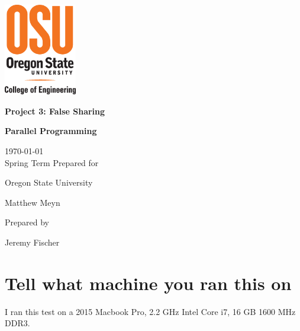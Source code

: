 \documentclass[onecolumn,draftclsnofoot, 10pt, compsoc]{IEEEtran}
\def \GroupNumber{		17}
\def \Jeremy{			Jeremy Fischer}
\def \Class{		Parallel Programming}
\def \Assn{		Project 3: False Sharing}
\def \School{	Oregon State University}
\def \Professor{		Matthew Meyn}
\begin{document}
\begin{titlepage}
    \begin{singlespace}
    	\includegraphics[height=4cm]{coe.eps}
        \hfill  
        \par\vspace{.2in}
        \centering
        \scshape{
            \vspace{.5in}
            \textbf{\Large\Assn}\par
            \textbf{\large\Class}\par
            \large{
            	\today \\Spring Term
        	}
            \vfill
            {\large Prepared for}\par
            \huge \School\par
            \vspace{5pt}
            {\Large{\Professor}\par}
            {\large Prepared by }\par
            \vspace{5pt}
            {\Large
                {\Jeremy}\par
            }
            \vspace{20pt}
        }

    \end{singlespace}
\end{titlepage}
\newpage
{}

\clearpage







	\section{Tell what machine you ran this on}	
	I ran this test on a 2015 Macbook Pro, 2.2 GHz Intel Core i7, 16 GB 1600 MHz DDR3.
	
\end{document}
